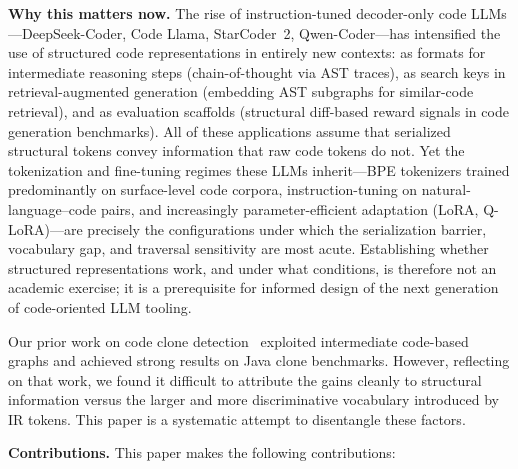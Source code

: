 \documentclass[pdflatex,sn-mathphys,Numbered]{sn-jnl}
\begin{document}
\textbf{Why this matters now.} The rise of instruction-tuned decoder-only code LLMs---DeepSeek-Coder, Code Llama, StarCoder~2, Qwen-Coder---has intensified the use of structured code representations in entirely new contexts: as formats for intermediate reasoning steps (chain-of-thought via AST traces), as search keys in retrieval-augmented generation (embedding AST subgraphs for similar-code retrieval), and as evaluation scaffolds (structural diff-based reward signals in code generation benchmarks). All of these applications assume that serialized structural tokens convey information that raw code tokens do not. Yet the tokenization and fine-tuning regimes these LLMs inherit---BPE tokenizers trained predominantly on surface-level code corpora, instruction-tuning on natural-language--code pairs, and increasingly parameter-efficient adaptation (LoRA, Q-LoRA)---are precisely the configurations under which the serialization barrier, vocabulary gap, and traversal sensitivity are most acute. Establishing whether structured representations work, and under what conditions, is therefore not an academic exercise; it is a prerequisite for informed design of the next generation of code-oriented LLM tooling.

Our prior work on code clone detection~\citep{yuan2023clone} exploited intermediate code-based graphs and achieved strong results on Java clone benchmarks. However, reflecting on that work, we found it difficult to attribute the gains cleanly to structural information versus the larger and more discriminative vocabulary introduced by IR tokens. This paper is a systematic attempt to disentangle these factors.

\textbf{Contributions.} This paper makes the following contributions:
\end{document}
